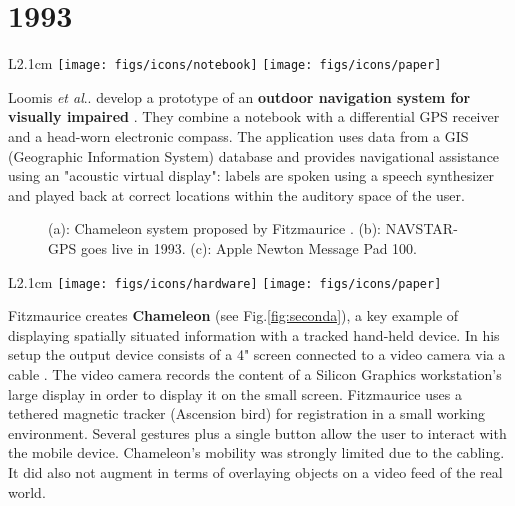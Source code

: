 \documentclass[12pt,a4paper]{article}
\makeatletter
\DeclareRobustCommand\onedot{\futurelet\@let@token\@onedot}
\def\@onedot{\ifx\@let@token.\else.\null\fi\xspace}
\def\etal{\emph{et al}\onedot}
\makeatother
\begin{document}
\newpage

\vspace{-5pt}
\section*{1993}
\begin{wrapfigure}{L}{2.1cm}
	\vspace{-10pt}	
	\texttt{[image: figs/icons/notebook]}
	\texttt{[image: figs/icons/paper]}
	\vspace{-20pt}		
\end{wrapfigure}
Loomis \etal develop a prototype of an \textbf{outdoor navigation system for visually impaired} \cite{Loomis93}. They combine a notebook with a differential GPS receiver and a head-worn electronic compass. The application uses data from a GIS (Geographic Information System) database and provides navigational assistance using an "acoustic virtual display": labels are spoken using a speech synthesizer and played back at correct locations within the auditory space of the user.

\begin{figure}
\vspace{-10pt}
\centering
{} \hfill
{}
\vspace{-10pt}
\caption{(a): Chameleon system proposed by Fitzmaurice \cite{Fitzmaurice93}. (b): NAVSTAR-GPS goes live in 1993. (c): Apple Newton Message Pad 100.} \label{fig:second}
\end{figure}

\vspace{0.1in}

\begin{wrapfigure}{L}{2.1cm}
	\vspace{-10pt}	
	\texttt{[image: figs/icons/hardware]}
	\texttt{[image: figs/icons/paper]}
	\vspace{-20pt}		
\end{wrapfigure}
\noindent Fitzmaurice creates \textbf{Chameleon} (see Fig.\ref{fig:seconda}), a key example of displaying spatially situated information with a tracked hand-held device. In his setup the output device consists of a 4" screen connected to a video camera via a cable \cite{Fitzmaurice93}. The video camera records the content of a Silicon Graphics workstation's large display in order to display it on the small screen. Fitzmaurice uses a tethered magnetic tracker (Ascension bird) for registration in a small working environment. Several gestures plus a single button allow the user to interact with the mobile device. Chameleon's mobility was strongly limited due to the cabling. It did also not augment in terms of overlaying objects on a video feed of the real world. 
\end{document}
